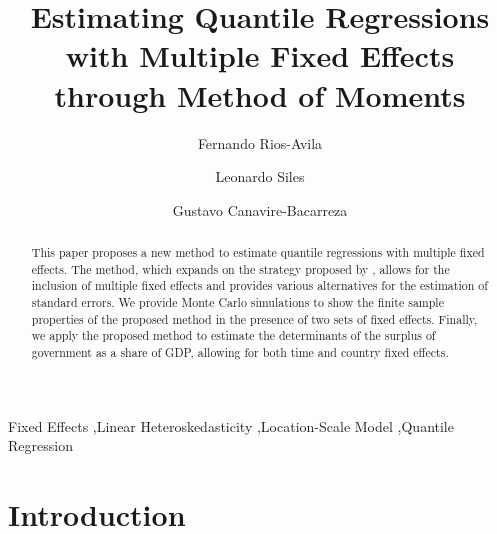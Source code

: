 \documentclass[
  authoryear,
  review,
  1p]{elsarticle}
\begin{document}
\begin{frontmatter}
\title{Estimating Quantile Regressions with Multiple Fixed Effects through Method of Moments}

\author[1]{Fernando Rios-Avila%
%
}
 
\author[2]{Leonardo Siles%
%
}
\author[3]{Gustavo Canavire-Bacarreza%
%
}




        
\begin{abstract}
This paper proposes a new method to estimate quantile regressions with
multiple fixed effects. The method, which expands on the strategy proposed by
\citet{mss2019}, allows for the inclusion of multiple fixed effects and provides
various alternatives for the estimation of standard errors. We provide
Monte Carlo simulations to show the finite sample properties of the
proposed method in the presence of two sets of fixed effects. Finally,
we apply the proposed method to estimate the determinants of the surplus
of government as a share of GDP, allowing for both time and country fixed
effects.
\end{abstract}





\begin{keyword}
    Fixed Effects \sep Linear Heteroskedasticity \sep Location-Scale Model \sep Quantile Regression
\end{keyword}


\end{frontmatter}
    \ifdefined\Shaded\renewenvironment{Shaded}{\begin{tcolorbox}[interior hidden, borderline west={3pt}{0pt}{shadecolor}, boxrule=0pt, sharp corners, enhanced, breakable, frame hidden]}{\end{tcolorbox}}\fi

\hypertarget{introduction}{%
\section{Introduction}\label{introduction}}
\end{document}
